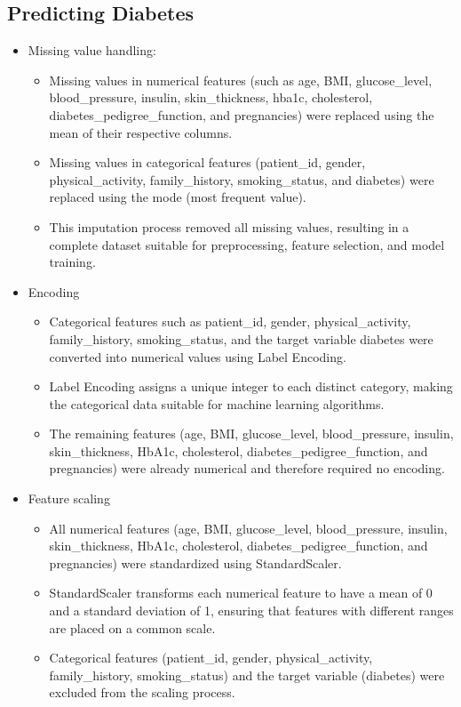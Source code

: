 \documentclass[12pt,a4paper]{article}
\begin{document}
\subsection*{Predicting Diabetes}
\begin{itemize}
\item Missing value handling:
\begin{itemize}
\item Missing values in numerical features (such as age, BMI, glucose\_level, blood\_pressure, insulin, skin\_thickness, hba1c, cholesterol, diabetes\_pedigree\_function, and pregnancies) were replaced using the mean of their respective columns.
\item Missing values in categorical features (patient\_id, gender, physical\_activity, family\_history, smoking\_status, and diabetes) were replaced using the mode (most frequent value).
\item This imputation process removed all missing values, resulting in a complete dataset suitable for preprocessing, feature selection, and model training.
\end{itemize}
\item Encoding
\begin{itemize}
\item Categorical features such as patient\_id, gender, physical\_activity, family\_history, smoking\_status, and the target variable diabetes were converted into numerical values using Label Encoding.
\item Label Encoding assigns a unique integer to each distinct category, making the categorical data suitable for machine learning algorithms.
\item The remaining features (age, BMI, glucose\_level, blood\_pressure, insulin, skin\_thickness, HbA1c, cholesterol, diabetes\_pedigree\_function, and pregnancies) were already numerical and therefore required no encoding.
\end{itemize}
\item Feature scaling
\begin{itemize}
\item All numerical features (age, BMI, glucose\_level, blood\_pressure, insulin, skin\_thickness, HbA1c, cholesterol, diabetes\_pedigree\_function, and pregnancies) were standardized using StandardScaler.
\item StandardScaler transforms each numerical feature to have a mean of 0 and a standard deviation of 1, ensuring that features with different ranges are placed on a common scale.
\item Categorical features (patient_id, gender, physical_activity, family_history, smoking_status) and the target variable (diabetes) were excluded from the scaling process.

\end{itemize}
\end{itemize}
\end{document}
